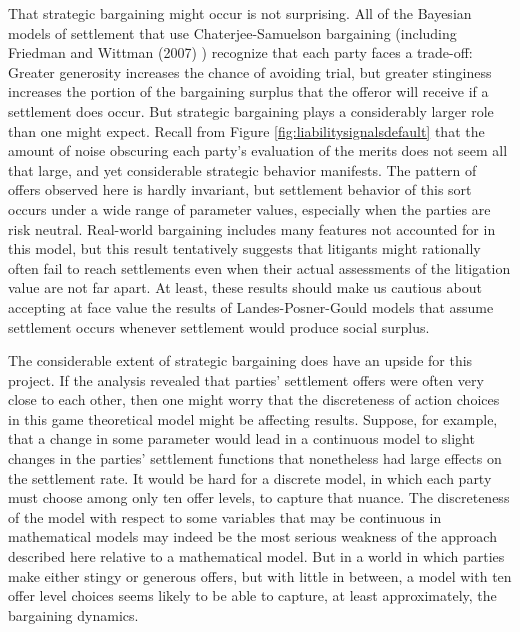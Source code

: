 \documentclass{article}
\begin{document}
That strategic bargaining might occur is not surprising. All of the Bayesian models of settlement that use Chaterjee-Samuelson bargaining (including Friedman and Wittman (2007) \cite{friedmanwittman}) recognize that each party faces a trade-off: Greater generosity increases the chance of avoiding trial, but greater stinginess increases the portion of the bargaining surplus that the offeror will receive if a settlement does occur. But strategic bargaining plays a considerably larger role than one might expect. Recall from Figure \ref{fig:liabilitysignalsdefault} that the amount of noise obscuring each party's evaluation of the merits does not seem all that large, and yet considerable strategic behavior manifests. The pattern of offers observed here is hardly invariant, but settlement behavior of this sort occurs under a wide range of parameter values, especially when the parties are risk neutral. Real-world bargaining includes many features not accounted for in this model, but this result tentatively suggests that litigants might rationally often fail to reach settlements even when their actual assessments of the litigation value are not far apart. At least, these results should make us cautious about accepting at face value the results of Landes-Posner-Gould models that assume settlement occurs whenever settlement would produce social surplus.

The considerable extent of strategic bargaining does have an upside for this project. If the analysis revealed that parties' settlement offers were often very close to each other, then one might worry that the discreteness of action choices in this game theoretical model might be affecting results. Suppose, for example, that a change in some parameter would lead in a continuous model to slight changes in the parties' settlement functions that nonetheless had large effects on the settlement rate. It would be hard for a discrete model, in which each party must choose among only ten offer levels, to capture that nuance. The discreteness of the model with respect to some variables that may be continuous in mathematical models may indeed be the most serious weakness of the approach described here relative to a mathematical model. But in a world in which parties make either stingy or generous offers, but with little in between, a model with ten offer level choices seems likely to be able to capture, at least approximately, the bargaining dynamics.
\end{document}
